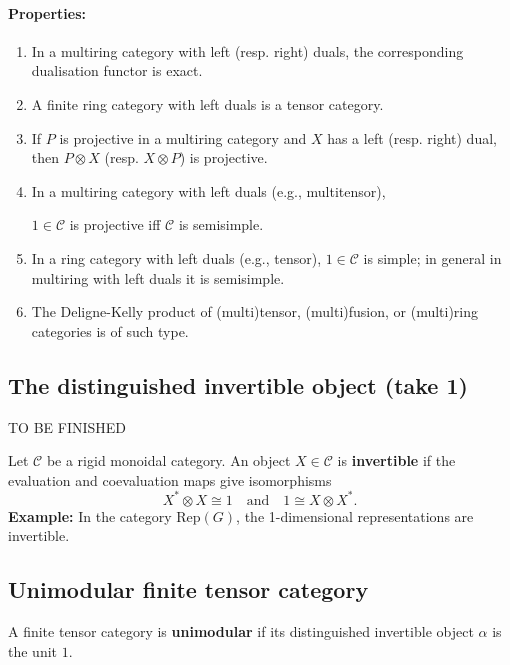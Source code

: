 \documentclass[11pt]{article}
\theoremstyle{definition}
\begin{document}
\paragraph{Properties:}
\begin{enumerate}
  \item In a multiring category with left (resp. right) duals, the corresponding dualisation functor is exact.
  \item A finite ring category with left duals is a tensor category.
  \item If \( P \) is projective in a multiring category and \( X \) has a left (resp. right) dual, then \( P \otimes X \) (resp. \( X \otimes P \)) is projective.
  \item In a multiring category with left duals (e.g., multitensor), 
  \begin{center}

      \( 1 \in \mathcal{C} \) is projective iff \( \mathcal{C} \) is semisimple.

  \end{center}
  \item In a ring category with left duals (e.g., tensor), \( 1 \in \mathcal{C} \) is simple; in general in multiring with left duals it is semisimple.
  \item The Deligne-Kelly product of (multi)tensor, (multi)fusion, or (multi)ring categories is of such type.
\end{enumerate}




\subsection{The distinguished invertible object (take 1)}

{\color{red} TO BE FINISHED }


Let \( \mathcal{C} \) be a rigid monoidal category. An object \( X \in \mathcal{C} \) is \textbf{invertible} if the evaluation and coevaluation maps give isomorphisms
\[
X^* \otimes X \cong 1 \quad \text{and} \quad 1 \cong X \otimes X^*.
\]
\textbf{Example:} In the category \( \mathrm{Rep}(G) \), the 1-dimensional representations are invertible.

\subsection{Unimodular finite tensor category}
A finite tensor category is \textbf{unimodular} if its distinguished invertible object \( \alpha \) is the unit \( 1 \).
\end{document}
